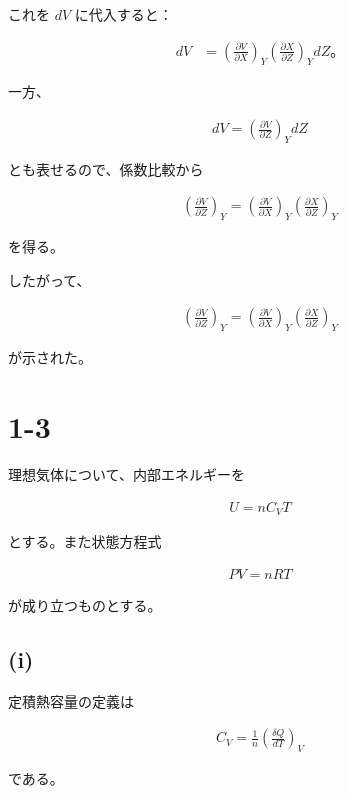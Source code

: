 \documentclass[platex,dvipdfmx,a4paper]{jsarticle}
\begin{document}
これを $dV$ に代入すると：

\begin{align*}
dV
&=
\left(\frac{\partial V}{\partial X}\right)_Y
\left(\frac{\partial X}{\partial Z}\right)_Y
dZ。
\end{align*}

一方、

\begin{align*}
dV
=
\left(\frac{\partial V}{\partial Z}\right)_Y dZ
\end{align*}

とも表せるので、係数比較から

\begin{align*}
\left(\frac{\partial V}{\partial Z}\right)_Y
=
\left(\frac{\partial V}{\partial X}\right)_Y
\left(\frac{\partial X}{\partial Z}\right)_Y
\end{align*}

を得る。

したがって、

\begin{align*}
\boxed{
\left(\frac{\partial V}{\partial Z}\right)_Y
=
\left(\frac{\partial V}{\partial X}\right)_Y
\left(\frac{\partial X}{\partial Z}\right)_Y
}
\end{align*}

が示された。
\section{1-3}

理想気体について、内部エネルギーを

\begin{align*}
U=nC_VT
\end{align*}

とする。また状態方程式

\begin{align*}
PV=nRT
\end{align*}

が成り立つものとする。

\subsection{(i)}

定積熱容量の定義は

\begin{align*}
C_V
=
\frac{1}{n}
\left(
\frac{\delta Q}{dT}
\right)_V
\end{align*}

である。
\end{document}

